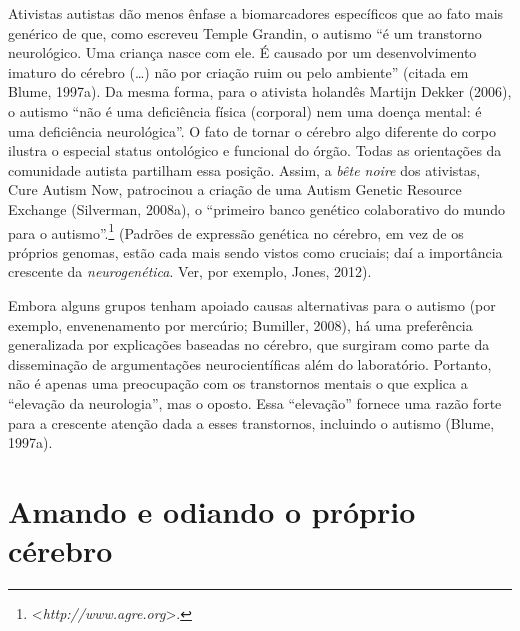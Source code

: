 Ativistas autistas dão menos ênfase a biomarcadores específicos que ao
fato mais genérico de que, como escreveu Temple Grandin, o autismo ``é
um transtorno neurológico. Uma criança nasce com ele. É causado por um
desenvolvimento imaturo do cérebro (\ldots{}) não por criação ruim ou pelo
ambiente'' (citada em Blume, 1997a). Da mesma forma, para o ativista
holandês Martijn Dekker (2006), o autismo ``não é uma deficiência física
(corporal) nem uma doença mental: é uma deficiência neurológica''. O
fato de tornar o cérebro algo diferente do corpo ilustra o especial
status ontológico e funcional do órgão. Todas as orientações da
comunidade autista partilham essa posição. Assim, a \emph{bête noire}
dos ativistas, Cure Autism Now, patrocinou a criação de uma Autism
Genetic Resource Exchange (Silverman, 2008a), o ``primeiro banco
genético colaborativo do mundo para o autismo''.\footnote[20]{\textless{}\emph{http://www.agre.org}\textgreater{}.}
(Padrões de expressão genética no cérebro, em vez de os próprios
genomas, estão cada mais sendo vistos como cruciais; daí a importância
crescente da \emph{neurogenética}. Ver, por exemplo, Jones, 2012).

Embora alguns grupos tenham apoiado causas alternativas para o autismo
(por exemplo, envenenamento por mercúrio; Bumiller, 2008), há uma
preferência generalizada por explicações baseadas no cérebro, que
surgiram como parte da disseminação de argumentações neurocientíficas
além do laboratório. Portanto, não é apenas uma preocupação com os
transtornos mentais o que explica a ``elevação da neurologia'', mas o
oposto. Essa ``elevação'' fornece uma razão forte para a crescente
atenção dada a esses transtornos, incluindo o autismo (Blume, 1997a).

\section{Amando e odiando o próprio cérebro}

